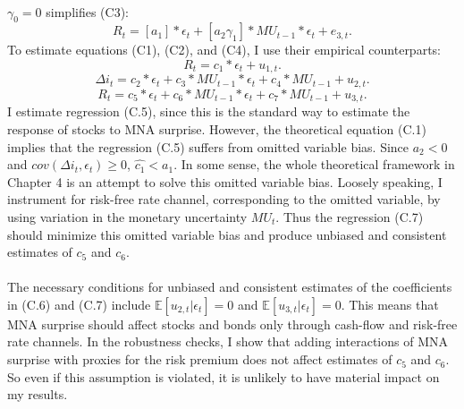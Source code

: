\documentclass[12pt]{article}
\begin{document}
\paragraph{}
$\gamma_0=0$ simplifies (C3):
\begin{equation}
    R_t = [a_1]*\epsilon_t + [a_2\gamma_1]*MU_{t-1}*\epsilon_t + e_{3,t}.
\end{equation}
To estimate equations (C1), (C2), and (C4), I use their empirical counterparts:
\begin{equation}
    R_t = c_1*\epsilon_t + u_{1,t}.
\end{equation}
\begin{equation}
    \Delta i_t = c_2*\epsilon_t + c_3*MU_{t-1}*\epsilon_t + c_4*MU_{t-1} + u_{2,t}.
\end{equation}
\begin{equation}
    R_t = c_5*\epsilon_t + c_6*MU_{t-1}*\epsilon_t + c_7*MU_{t-1} + u_{3,t}.
\end{equation}
I estimate regression (C.5), since this is the standard way to estimate the response of stocks to MNA surprise. However, the theoretical equation (C.1) implies that the regression (C.5) suffers from omitted variable bias. Since $a_2 < 0$ and $cov(\Delta i_{t}, \epsilon_t) \ge 0$, $\hat{c_1}<a_1$. In some sense, the whole theoretical framework in Chapter 4 is an attempt to solve this omitted variable bias. Loosely speaking, I instrument for risk-free rate channel, corresponding to the omitted variable, by using variation in the monetary uncertainty $MU_t$. Thus the regression (C.7) should minimize this omitted variable bias and produce unbiased and consistent estimates of $c_5$ and $c_6$.
\paragraph{}
The necessary conditions for unbiased and consistent estimates of the coefficients in (C.6) and (C.7) include $\mathbb{E}[u_{2,t}|\epsilon_t]=0$ and 
$\mathbb{E}[u_{3,t}|\epsilon_t]=0$. This means that MNA surprise should affect stocks and bonds only through cash-flow and risk-free rate channels. In the robustness checks, I show that adding interactions of MNA surprise with proxies for the risk premium does not affect estimates of $c_5$ and $c_6$. So even if this assumption is violated, it is unlikely to have material impact on my results.
\end{document}
